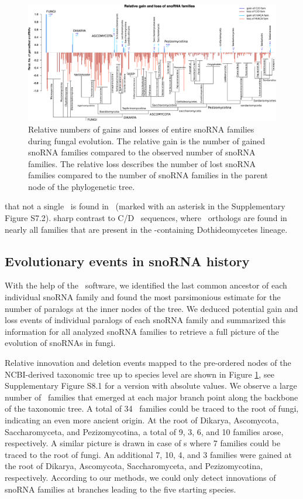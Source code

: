 \begin{figure}
  \centering
  \includegraphics[width=\textwidth]{pics/fungi_relative_gain_loss_PAPERVERSION.eps}
  \caption{Relative numbers of gains and losses of entire snoRNA families
    during fungal evolution. The relative gain is the number of gained
    snoRNA families compared to the observed number of snoRNA families. The
    relative loss describes the number of lost snoRNA families compared to
    the number of snoRNA families in the parent node of the phylogenetic
    tree.}
\label{fig:relative_innovation_deletion_event}
\end{figure}

 that not a single \haca\ is found in \Ptt\ (marked with an
asterisk in the Supplementary Figure S7.2). 
sharp contrast to C/D \sno\ sequences, where \ptt\ orthologs are found in
nearly all families that are present in the \ptt-containing Dothideomycetes
lineage.

\subsection{Evolutionary events in snoRNA history}

With the help of the \epope\ software, we identified the last common
ancestor of each individual snoRNA family and found the most parsimonious
estimate for the number of paralogs at the inner nodes of the tree.  We
deduced potential gain and loss events of individual paralogs of each
snoRNA family and summarized this information for all analyzed snoRNA
families to retrieve a full picture of the evolution of snoRNAs in fungi.

Relative innovation and deletion events mapped to the pre-ordered nodes of
the NCBI-derived taxonomic tree up to species level are shown in Figure
\ref{fig:relative_innovation_deletion_event}, see Supplementary Figure S8.1
for a version with absolute values.  We observe a large number of \sno\
families that emerged at each major branch point along the backbone of the
taxonomic tree. A total of 34 \cd\ families could be traced to the root of
fungi, indicating an even more ancient origin. At the root of Dikarya,
Ascomycota, Saccharomyceta, and Pezizomycotina, a total of 9, 3, 6, and 10
families arose, respectively. A similar picture is drawn in case of \haca s
where 7 families could be traced to the root of fungi. An additional 7, 10,
4, and 3 families were gained at the root of Dikarya, Ascomycota,
Saccharomyceta, and Pezizomycotina, respectively.  According to our
methods, we could only detect innovations of snoRNA families at branches
leading to the five starting species.


